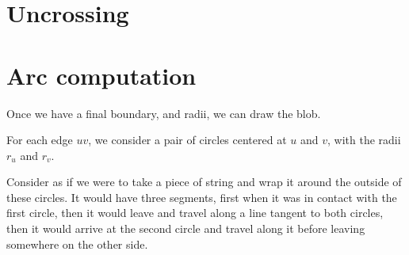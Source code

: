 \documentclass[paper=a4, fontsize=11pt]{scrartcl} %
\numberwithin{equation}{section} %
\numberwithin{figure}{section} %
\numberwithin{table}{section} %
\begin{document}
\section{Uncrossing}

\section{Arc computation}
Once we have a final boundary, and radii, we can draw the blob.

For each edge $uv$, we consider a pair of circles centered at
$u$ and $v$, with the radii $r_u$ and $r_v$.

Consider as if we were to take a piece of string and wrap it around
the outside of these circles.
It would have three segments,
first when it was in contact with the first circle,
then it would leave and travel along a line tangent to both circles,
then it would arrive at the second circle
and travel along it before leaving somewhere on the other side.




\end{document}

